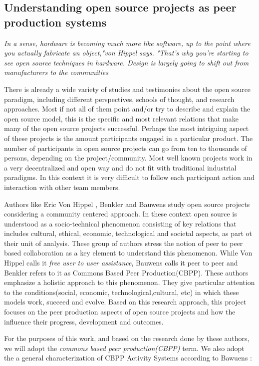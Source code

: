 \documentclass{ICED-Paper}%
\begin{document}
\subsection{Understanding open source projects as peer production systems}
\emph{In a sense, hardware is becoming much more like software, up to the point where you actually fabricate an object,"von Hippel says. "That's why you're starting to see open source techniques in hardware. Design is largely going to shift out from manufacturers to the communities}\cite{OH_Works?}
\bigskip

There is already a wide variety of studies and testimonies about the open source paradigm, including different perspectives, schools of thought, and research approaches. Most if not all of them point and/or try to describe and explain the open source model, this is the specific and most relevant relations that make many of the open source projects successful. Perhaps the most intriguing aspect of these projects is the amount participants engaged in a particular product. The number of participants in open source projects can go from ten to thousands of persons, depending on the project/community. Most well known projects work in a very decentralized and open way and do not fit with traditional industrial paradigms. In this context it is very difficult to follow each participant action and interaction with other team members.

Authors like Eric Von Hippel \cite{hippel_2}, Benkler \cite{Benkler} and Bauwens \cite{p2pEconomy} study open source projects considering a community centered approach. In these context open source is understood as a socio-technical phenomenon consisting of key relations that includes cultural, ethical, economic, technological and societal aspects, as part ot their unit of analysis. These group of authors stress the notion of peer to peer based collaboration as a key element to understand this phenomenon. While Von Hippel calls it \emph{free user to user assistance}, Bauwens calls it peer to peer and Benkler refers to it as Commons Based Peer Production(CBPP). These authors emphasize a holistic approach to this phenomenon. They give particular attention to the conditions(social, economic, technological,cultural, etc) in which these models work, succeed and evolve. Based on this research approach, this project focuses on the peer production aspects of open source projects and how the influence their progress, development and outcomes.
\bigskip

For the purposes of this work, and based on the research done by these authors, we will adopt the \emph{commons based peer production(CBPP)} term. We also adopt the a general characterization of CBPP Activity Systems according to Bawuens \cite{p2pEconomy}:
\end{document}
